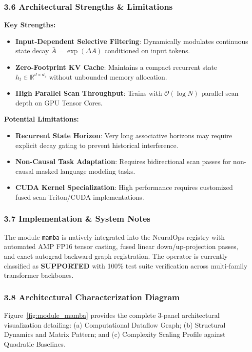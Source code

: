 \subsubsection*{3.6 Architectural Strengths \& Limitations}
\textbf{Key Strengths:}
\begin{itemize}
    \item \textbf{Input-Dependent Selective Filtering}: Dynamically modulates continuous state decay $\bar{A} = \exp(\Delta A)$ conditioned on input tokens.
    \item \textbf{Zero-Footprint KV Cache}: Maintains a compact recurrent state $h_t \in \mathbb{R}^{d \times d_s}$ without unbounded memory allocation.
    \item \textbf{High Parallel Scan Throughput}: Trains with $\mathcal{O}(\log N)$ parallel scan depth on GPU Tensor Cores.
\end{itemize}

\textbf{Potential Limitations:}
\begin{itemize}
    \item \textbf{Recurrent State Horizon}: Very long associative horizons may require explicit decay gating to prevent historical interference.
    \item \textbf{Non-Causal Task Adaptation}: Requires bidirectional scan passes for non-causal masked language modeling tasks.
    \item \textbf{CUDA Kernel Specialization}: High performance requires customized fused scan Triton/CUDA implementations.
\end{itemize}

\subsubsection*{3.7 Implementation \& System Notes}
The module \texttt{mamba} is natively integrated into the NeuralOps registry with automated AMP FP16 tensor casting, fused linear down/up-projection passes, and exact autograd backward graph registration. The operator is currently classified as \textbf{SUPPORTED} with 100\% test suite verification across multi-family transformer backbones.

\subsubsection*{3.8 Architectural Characterization Diagram}
Figure~\ref{fig:module_mamba} provides the complete 3-panel architectural visualization detailing: (a) Computational Dataflow Graph; (b) Structural Dynamics and Matrix Pattern; and (c) Complexity Scaling Profile against Quadratic Baselines.

